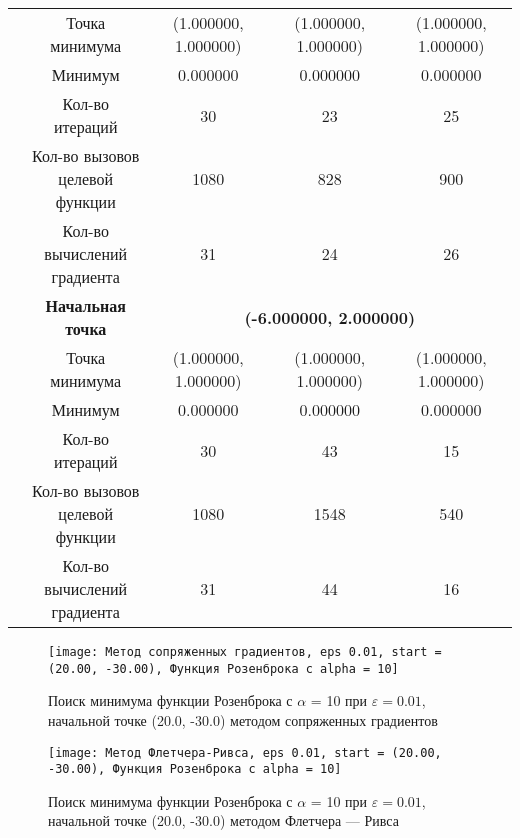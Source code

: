 \begin{table}[H]
\begin{tabular}{|c|c|c|c|c|}
	\cline{2-5}
	&Точка минимума &(1.000000, 1.000000) &(1.000000, 1.000000) &(1.000000, 1.000000) \\ 
	\cline{2-5}
	&Минимум &0.000000 &0.000000 &0.000000 \\ 
	\cline{2-5}
	&Кол-во итераций &30 &23 &25 \\ 
	\cline{2-5}
	&\makecell{Кол-во вызовов\\целевой функции} &1080 &828 &900 \\ 
	\cline{2-5}
	&\makecell{Кол-во вычислений\\градиента} &31 &24 &26 \\ 
	\cline{2-5}
\cline{2-5}&\textbf{Начальная точка} &\multicolumn{3}{c|}{\textbf{(-6.000000, 2.000000)}}\\
	\cline{2-5}
	&Точка минимума &(1.000000, 1.000000) &(1.000000, 1.000000) &(1.000000, 1.000000) \\ 
	\cline{2-5}
	&Минимум &0.000000 &0.000000 &0.000000 \\ 
	\cline{2-5}
	&Кол-во итераций &30 &43 &15 \\ 
	\cline{2-5}
	&\makecell{Кол-во вызовов\\целевой функции} &1080 &1548 &540 \\ 
	\cline{2-5}
	&\makecell{Кол-во вычислений\\градиента} &31 &44 &16 \\ 
	\cline{2-5}
	\hline

\end{tabular}
\end{table}


            \begin{figure}[H]
	        \centering
	        \texttt{[image: Метод сопряженных градиентов, eps 0.01, start = (20.00, -30.00), Функция Розенброка с alpha = 10]}%
	        \caption{Поиск минимума функции Розенброка с $\alpha$ = 10 при $\varepsilon = 0.01$, начальной точке (20.0, -30.0) методом сопряженных градиентов}
	        \vspace*{-1.2cm}
            \end{figure}
            
            \begin{figure}[H]
	        \centering
	        \texttt{[image: Метод Флетчера-Ривса, eps 0.01, start = (20.00, -30.00), Функция Розенброка с alpha = 10]}%
	        \caption{Поиск минимума функции Розенброка с $\alpha$ = 10 при $\varepsilon = 0.01$, начальной точке (20.0, -30.0) методом Флетчера --- Ривса}
	        \vspace*{-1.2cm}
            \end{figure}
            
